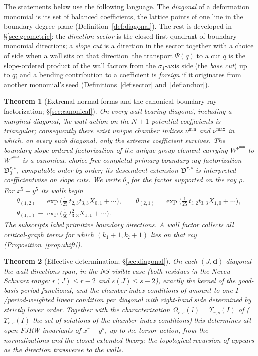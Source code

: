 \documentclass[11pt]{amsart}
\newtheorem{theorem}{Theorem}[section]
\theoremstyle{definition}
\theoremstyle{remark}
\newcommand{\Dscr}{\mathfrak{D}}
\newcommand{\Om}{\Omega_{r,s}}
\begin{document}
The statements below use the following language. The \emph{diagonal} of a
deformation monomial is its set of balanced coefficients, the lattice points
of one line in the boundary-degree plane (Definition~\ref{def:diagonal}).
The rest is developed in
\S\ref{sec:geometric}: the \emph{direction sector} is the closed first
quadrant of boundary-monomial directions; a \emph{slope cut} is a direction in
the sector together with a choice of side when a wall sits on that direction;
the transport $\Psi(q)$ to a cut $q$ is the slope-ordered product of the wall
factors from the $\sigma_{1}$-axis side (the \emph{base cut}) up to $q$; and a
bending contribution to a coefficient is \emph{foreign} if it originates from
another monomial's seed (Definitions~\ref{def:sector} and~\ref{def:anchor}).

\begin{theorem}[Extremal normal forms and the canonical boundary-ray
factorization; \S\ref{sec:canonical}]
\label{thm:canonical}
On every wall-bearing diagonal, including a marginal diagonal, the wall action
on the $N{+}1$ potential coefficients is triangular; consequently there exist
unique chamber indices $\nu^{\min}$ and $\nu^{\max}$ in which, on every such
diagonal, only the extreme coefficient survives. The boundary-slope-ordered
factorization of the unique group element
carrying $W^{\nu^{\min}}$ to $W^{\nu^{\max}}$ is a canonical, choice-free
completed primary boundary-ray factorization $\Dscr^{r,s}_{0}$, computable
order by order; its descendent extension $\Dscr^{r,s}$ is interpreted
coefficientwise on slope cuts. We write $\theta_{\rho}$ for the factor supported on the
ray $\rho$. For $x^{5}+y^{5}$
its walls begin
\begin{gather*}
\theta_{(1,2)}=\exp\bigl(\tfrac1{25}\,t_{2,3}t_{3,3}X_{0,1}+\cdots\bigr),\qquad
\theta_{(2,1)}=\exp\bigl(\tfrac1{25}\,t_{3,2}t_{3,3}X_{1,0}+\cdots\bigr),\\
\theta_{(1,1)}=\exp\bigl(\tfrac1{50}\,t_{3,3}^{2}X_{1,1}+\cdots\bigr).
\end{gather*}
The subscripts label primitive boundary directions. A wall factor collects all
critical-graph terms for which $(k_{1}{+}1,k_{2}{+}1)$ lies on that ray
(Proposition~\ref{prop:shift}).
\end{theorem}

\begin{theorem}[Effective determination; \S\ref{sec:diagonal}]
\label{thm:effective}
On each $(J,\mathbf d)$-diagonal the wall directions span, in the NS-visible
case (both residues in the Neveu--Schwarz range: $r(J)\le r-2$ and
$s(J)\le s-2$), exactly the kernel of the good-basis period functional, and the chamber-index
conditions of \cite{GKT} amount to one $\Gamma$/period-weighted linear condition
per diagonal with right-hand side determined by strictly lower order. Together with
the characterization $\Om(I)=\Upsilon_{r,s}(I)$ of \cite[Cor.~5.14]{GKT}
($\Upsilon_{r,s}(I)$ the set of solutions of the chamber-index conditions) this
determines all open FJRW invariants of $x^{r}+y^{s}$, up to the torsor action,
from the normalizations and the closed extended theory: the topological recursion
of \cite[Thm.~0.5]{GKT} appears as the direction transverse to the walls.
\end{theorem}
\end{document}
